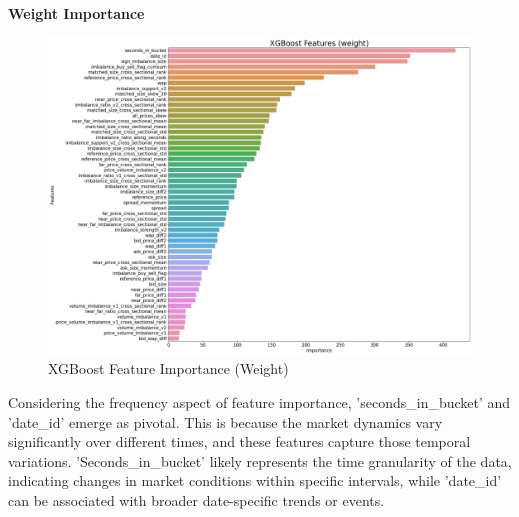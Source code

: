 \documentclass[12pt]{article}
\newtheorem{Proof of Lemma}{Proof of Lemma}
\begin{document}
\noindent \textbf{Weight Importance}
\begin{figure}[H]
  \centering
  \includegraphics[width=1\linewidth]{images/xgb_weight.png}
  \caption{XGBoost Feature Importance (Weight)}
  \label{fig:xgb_weight}
\end{figure}

Considering the frequency aspect of feature importance, 'seconds\_in\_bucket' and 'date\_id' emerge as pivotal. This is because the market dynamics vary significantly over different times, and these features capture those temporal variations. 'Seconds\_in\_bucket' likely represents the time granularity of the data, indicating changes in market conditions within specific intervals, while 'date\_id' can be associated with broader date-specific trends or events. 
\end{document}
